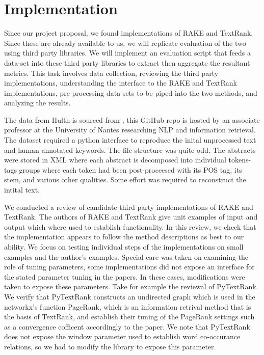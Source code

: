\documentclass[11pt,a4paper]{article}
\begin{document}
\section{Implementation}
Since our project proposal, we found implementations of RAKE and TextRank. Since these are already available to us, we will replicate  evaluation of the two using third party libraries. We will implement an evaluation script that feeds a data-set into these third party libraries to extract then aggregate the resultant metrics. This task involves data collection, reviewing the third party implementations, understanding the interface to the RAKE and TextRank implementations, pre-processing data-sets to be piped into the two methods, and analyzing the results.

The data from Hulth is sourced from \citet{Boudin}, this GitHub repo is hosted by an associate professor at the University of Nantes researching NLP and information retrieval. The dataset required a python interface to reproduce the inital unprocessed text and human annotated keywords. The file structure was quite odd. The abstracts were stored in XML where each abstract is decomposed into individual tokens-tags groups where each token had been post-proceesed with its POS tag, its stem, and various other qualities. Some effort was required to reconstruct the intital text.

We conducted a review of candidate third party implementations of RAKE and TextRank. The authors of RAKE and TextRank give unit examples of input and output which where used to establish functionality. In this review, we check that the implementation appears to follow the method descriptions as best to our ability. We focus on testing individual steps of the implementations on small examples and the author's examples. Special care was taken on examining the role of tuning parameters, some implementations did not expose an interface for the stated parameter tuning in the papers. In these cases, modifications were taken to expose these parameters. Take for example the reviewal of PyTextRank. We verify that PyTextRank constructs an undirected graph which is used in the networkx's function PageRank, which is an information retrival method that is the basis of TextRank, and establish their tuning of the PageRank settings such as a convergence cofficent accordingly to the paper. We note that PyTextRank does not expose the window parameter used to establish word co-occurance relations, so we had to modify the library to expose this parameter.
\end{document}
